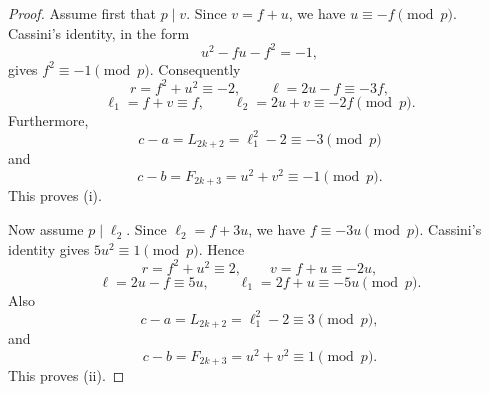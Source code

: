 \documentclass[10pt,a4paper]{amsart}
\begin{document}
\begin{proof}
Assume first that $p\mid v$.  Since $v=f+u$, we have
$u\equiv-f\pmod p$.  Cassini's identity, in the form
\[
 u^2-fu-f^2=-1,
\]
gives $f^2\equiv-1\pmod p$.  Consequently
\[
 r=f^2+u^2\equiv-2,\qquad
 \ell=2u-f\equiv-3f,
\]
\[
 \ell_1=f+v\equiv f,\qquad
 \ell_2=2u+v\equiv-2f\pmod p.
\]
Furthermore,
\[
 c-a=L_{2k+2}=\ell_1^2-2\equiv-3\pmod p
\]
and
\[
 c-b=F_{2k+3}=u^2+v^2\equiv-1\pmod p.
\]
This proves (i).

Now assume $p\mid\ell_2$.  Since $\ell_2=f+3u$, we have
$f\equiv-3u\pmod p$.  Cassini's identity gives
$5u^2\equiv1\pmod p$.  Hence
\[
 r=f^2+u^2\equiv2,\qquad
 v=f+u\equiv-2u,
\]
\[
 \ell=2u-f\equiv5u,\qquad
 \ell_1=2f+u\equiv-5u\pmod p.
\]
Also
\[
 c-a=L_{2k+2}=\ell_1^2-2\equiv3\pmod p,
\]
and
\[
 c-b=F_{2k+3}=u^2+v^2\equiv1\pmod p.
\]
This proves (ii).
\end{proof}
\end{document}
